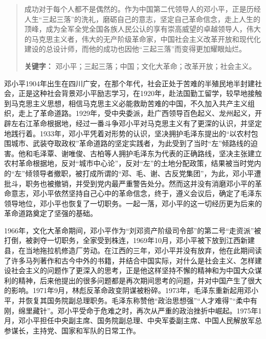 \documentclass[cs4size,a4paper,nofonts,twoside]{ctexart}
\begin{document}
\begin{abstract}
成功对于每个人都不是偶然的。作为中国第二代领导人的邓小平，正是历经人生“三起三落”的洗礼，磨砺自己的意志，坚定自己革命信念，走上人生的顶峰，成为全军全党全国各族人民公认的享有崇高威望的卓越领导人，伟大的马克思主义者，伟大的无产阶级革命家，中国社会主义改革开放和现代化建设的总设计师，而他的成功也因他“三起三落”而变得更加耀眼灿烂。

{\bf 关键字：} 邓小平；三起三落；中国；文化大革命；改革开放；社会主义。
\end{abstract}

\cleardoublepage


邓小平1904年出生在四川广安，在那个年代，社会正处于苦难的半殖民地半封建社会，正是这种社会背景邓小平励志学习，在1920年，赴法国勤工留学，较早地接触到马克思主义思想，相信马克思主义必能救助苦难的中国，不久加入共产主义组织，走上了革命道路。1929年，受中央委派，赴广西领导百色起义、龙州起义，开辟左右江革命根据地，经过一番斗争邓小平对马克思主义有了更深的认识，并坚定地践行着。1933年，邓小平凭着对形势的认识，坚决拥护毛泽东提出的“以农村包围城市、武装夺取政权”革命道路的坚定实践者，为此受到了当时“左”倾路线的迫害。他和毛泽覃、谢唯俊、古柏等人拥护毛泽东为代表的正确路线，坚决主张建立农村革命根据地，反对“城市中心论”，反对“左”的土地分配政策，结果被当时党内的“左”倾领导者撤职，被打成所谓的“邓、毛、谢、古反党集团”，为此，邓小平遭批斗，职务也被撤销，并受到党内最严重警告处分。然而这并没有消磨邓小平的革命意志，邓小平依然坚持自己心中的革命信念，终于，遵义会议后，确定了毛泽东领导地位，邓小平也恢复了一切职务。一起一落，邓小平的这一切经历更为后来的革命道路奠定了坚强的基础。

1966年，文化大革命期间，邓小平作为“刘邓资产阶级司令部”的第二号“走资派”被打倒，被剥夺一切职务，全家受到株连，1969年10月，邓小平被下放到江西新建县，在当地拖拉机修造厂劳动。在江西的三年，邓小平并没有放弃，他在此期间读了许多马列著作和古今中外的书籍，并结合中国实际，对什么是社会主义、怎样建设社会主义的问题作了更深入的思考，正是他这样坚持不懈的精神和为中国大众谋利的精神，后来他提出的很多问题都是再次期间思考的问题，并对中国产生了很大的影响。1971年9月，林彪反革命政变阴谋被粉碎。1973年，毛泽东重新起用邓小平，并恢复其国务院副总理职务。毛泽东称赞他“政治思想强”“人才难得”“柔中有刚，绵里藏针”。邓小平受命于危难之时，再次从严重的政治挫折中崛起。1975年1月，邓小平担任中央副主席、国务院副总理、中央军委副主席、中国人民解放军总参谋长，主持党、国家和军队的日常工作。
\end{document}

